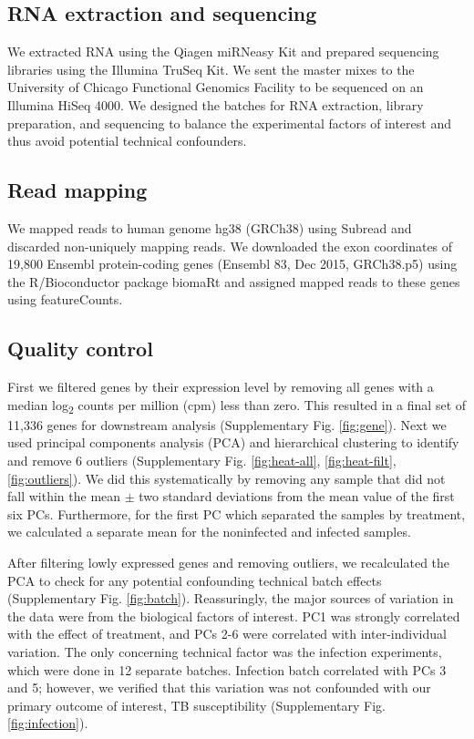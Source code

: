 \documentclass[fleqn,10pt]{wlscirep}
\begin{document}
\subsection*{RNA extraction and sequencing}

We extracted RNA using the Qiagen miRNeasy Kit and prepared sequencing libraries using the Illumina TruSeq Kit. We sent the master mixes to the University of Chicago Functional Genomics Facility to be sequenced on an Illumina HiSeq 4000. We designed the batches for RNA extraction, library preparation, and sequencing to balance the experimental factors of interest and thus avoid potential technical confounders.
\subsection*{Read mapping}

We mapped reads to human genome hg38 (GRCh38) using Subread and discarded non-uniquely mapping reads. We downloaded the exon coordinates of 19,800 Ensembl protein-coding genes (Ensembl 83, Dec 2015, GRCh38.p5) using the R/Bioconductor package biomaRt and assigned mapped reads to these genes using featureCounts.
\subsection*{Quality control}

First we filtered genes by their expression level by removing all genes with a median log\textsubscript{2} counts per million (cpm) less than zero. This resulted in a final set of 11,336 genes for downstream analysis (Supplementary Fig. \ref{fig:gene}). Next we used principal components analysis (PCA) and hierarchical clustering to identify and remove 6 outliers (Supplementary Fig. \ref{fig:heat-all}, \ref{fig:heat-filt}, \ref{fig:outliers}). We did this systematically by removing any sample that did not fall within the mean $\pm$ two standard deviations from the mean value of the first six PCs. Furthermore, for the first PC which separated the samples by treatment, we calculated a separate mean for the noninfected and infected samples.

After filtering lowly expressed genes and removing outliers, we recalculated the PCA to check for any potential confounding technical batch effects (Supplementary Fig. \ref{fig:batch}). Reassuringly, the major sources of variation in the data were from the biological factors of interest. PC1 was strongly correlated with the effect of treatment, and PCs 2-6 were correlated with inter-individual variation. The only concerning technical factor was the infection experiments, which were done in 12 separate batches. Infection batch correlated with PCs 3 and 5; however, we verified that this variation was not confounded with our primary outcome of interest, TB susceptibility (Supplementary Fig. \ref{fig:infection}).
\end{document}

